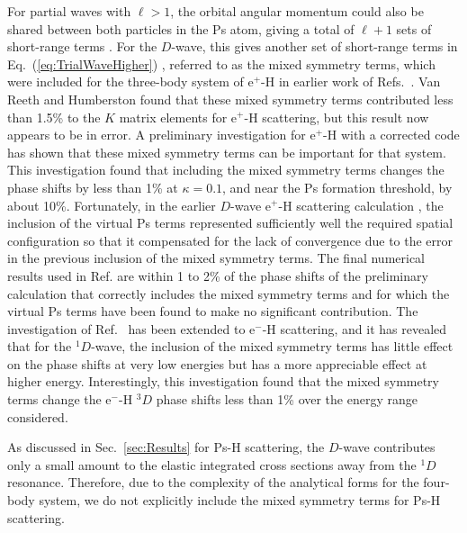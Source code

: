 \documentclass[preprint,showpacs,showkeys,preprintnumbers,amsmath,amssymb,longbibliography,pra,aps]{revtex4-1}
\begin{document}
{For partial waves with $\ell>1$, the orbital angular momentum could also be 
shared between both particles in the Ps atom, giving a total of
$\ell + 1$ sets of short-range terms \cite{Schwartz1961a}. For the
$D$-wave, this gives another set of short-range terms in
Eq.~(\ref{eq:TrialWaveHigher})
\cite{Humberston1997,VanReethThesis,BrownThesis}, referred to as the mixed
symmetry terms, which were included for the three-body system of e$^+$-H
in earlier work of
Refs.~\cite{Brown1985a,BrownThesis,WattsThesis,Humberston1997,VanReeth1997}.
Van Reeth and Humberston \cite{VanReeth1997} found that these
mixed symmetry terms contributed less than 1.5\% to the $K$ matrix elements
for e$^+$-H scattering, but this result now appears to be in error.
A preliminary investigation for e$^+$-H \cite{VanReeth2015} with a corrected
code has shown 
that these mixed symmetry terms can be important for that 
system. This investigation found that
including the mixed symmetry terms changes
the phase shifts by less than 1\% at $\kappa = 0.1$, and near the Ps formation
threshold, by about 10\%. Fortunately, in the earlier $D$-wave e$^+$-H
scattering
calculation \cite{Humberston1997}, the inclusion of the virtual Ps terms
represented sufficiently well the required spatial configuration so that it
compensated for the lack of convergence due to the
error in the previous inclusion of the mixed symmetry
terms. The final numerical results used in Ref. \cite{VanReeth1997} are
within 1 to 2\% of the phase shifts of the preliminary
calculation \cite{VanReeth2015} that correctly
includes the mixed symmetry terms and for which the virtual Ps terms have
been found to make no significant contribution. The investigation of
Ref.~\cite{VanReeth2015} has been extended to
e$^-$-H scattering, and it has revealed that
for the $^1D$-wave, the inclusion of the 
mixed symmetry terms has little effect on the phase shifts at very low
energies but has a more appreciable effect at higher energy. Interestingly,
this investigation found that the mixed symmetry terms change the
e$^-$-H $^3D$ phase shifts less than 1\% over the energy range considered.

As discussed in Sec.~\ref{sec:Results} for Ps-H scattering, the $D$-wave
contributes only a small amount to the elastic integrated cross sections away 
from the $^1D$ resonance. Therefore, due to the complexity of the analytical 
forms for the four-body system, we do not explicitly include the mixed 
symmetry terms for Ps-H scattering.


}
\end{document}
